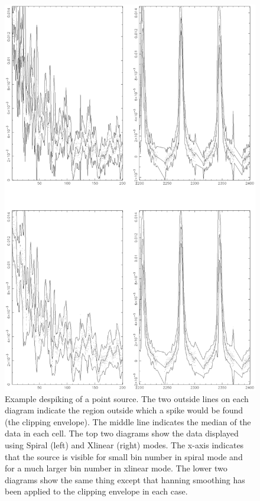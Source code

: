 \documentclass[twoside,11pt]{article}
\renewcommand{\_}{\texttt{\symbol{95}}}
\begin{document}
\begin{figure}
\begin{center}
\includegraphics[width=5in]{sun216_despike_eg.eps}
\caption{Example despiking of a point source. The two outside lines on each
diagram indicate the region outside which a spike would be found (the clipping
envelope). The middle line indicates the median of the data in each cell.  The
top two diagrams show the data displayed using Spiral (left) and Xlinear
(right) modes. The x-axis indicates that the source is visible for small
bin number in spiral mode and for a much larger bin number in xlinear
mode. The lower two diagrams show the same thing except that hanning smoothing 
has been applied to the clipping envelope in each case. }
\label{fig:despike_eg}
\end{center}
\end{figure}
\end{document}
